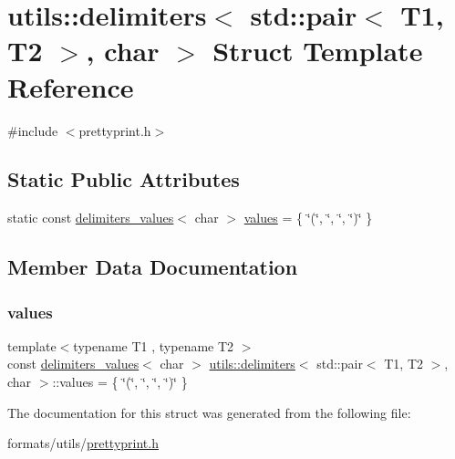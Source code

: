 \hypertarget{structutils_1_1delimiters_3_01std_1_1pair_3_01_t1_00_01_t2_01_4_00_01char_01_4}{}\section{utils\+::delimiters$<$ std\+::pair$<$ T1, T2 $>$, char $>$ Struct Template Reference}
\label{structutils_1_1delimiters_3_01std_1_1pair_3_01_t1_00_01_t2_01_4_00_01char_01_4}


{\ttfamily \#include $<$prettyprint.\+h$>$}

\subsection*{Static Public Attributes}
\begin{DoxyCompactItemize}
\item 
static const \mbox{\hyperlink{structutils_1_1delimiters__values}{delimiters\+\_\+values}}$<$ char $>$ \mbox{\hyperlink{structutils_1_1delimiters_3_01std_1_1pair_3_01_t1_00_01_t2_01_4_00_01char_01_4_a8f8b18042ac4873d166fea4d55c2063e}{values}} = \{ \char`\"{}(\char`\"{}, \char`\"{}, \char`\"{}, \char`\"{})\char`\"{} \}
\end{DoxyCompactItemize}


\subsection{Member Data Documentation}
\mbox{\label{structutils_1_1delimiters_3_01std_1_1pair_3_01_t1_00_01_t2_01_4_00_01char_01_4_a8f8b18042ac4873d166fea4d55c2063e}} 
\subsubsection{\texorpdfstring{values}{values}}
{\footnotesize\ttfamily template$<$typename T1 , typename T2 $>$ \\
const \mbox{\hyperlink{structutils_1_1delimiters__values}{delimiters\+\_\+values}}$<$ char $>$ \mbox{\hyperlink{structutils_1_1delimiters}{utils\+::delimiters}}$<$ std\+::pair$<$ T1, T2 $>$, char $>$\+::values = \{ \char`\"{}(\char`\"{}, \char`\"{}, \char`\"{}, \char`\"{})\char`\"{} \}\hspace{0.3cm}{\ttfamily [static]}}



The documentation for this struct was generated from the following file\+:\begin{DoxyCompactItemize}
\item 
formats/utils/\mbox{\hyperlink{prettyprint_8h}{prettyprint.\+h}}\end{DoxyCompactItemize}
